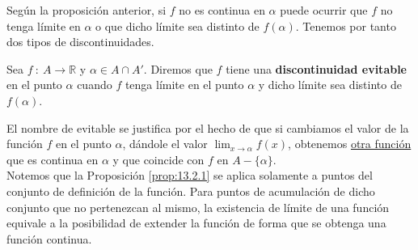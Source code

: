 Según la proposición anterior, si $f$ no es continua en $\alpha$ puede ocurrir que $f$ no tenga límite en $\alpha$ o que dicho límite sea distinto de $f(\alpha)$. Tenemos por tanto dos tipos de discontinuidades.
\begin{definicion}
    Sea $f ~:~ A \longrightarrow \mathbb{R}$ y $\alpha \in A \cap A'$. Diremos que $f$ tiene una \textbf{discontinuidad evitable} en el punto $\alpha$ cuando $f$ tenga límite en el punto $\alpha$ y dicho límite sea distinto de $f(\alpha)$.
\end{definicion}

El nombre de evitable se justifica por el hecho de que si cambiamos el valor de la función $f$ en el punto $\alpha$, dándole el valor $\displaystyle\lim_{x \to \alpha} f(x)$, obtenemos \underline{otra función} que es continua en $\alpha$ y que coincide con $f$ en $A - \{\alpha\}$.\\

Notemos que la Proposición \ref{prop:13.2.1} se aplica solamente a puntos del conjunto de definición de la función.
Para puntos de acumulación de dicho conjunto que no pertenezcan al mismo, la existencia de límite de una función equivale a la posibilidad de extender la función de forma que se obtenga una función continua.

